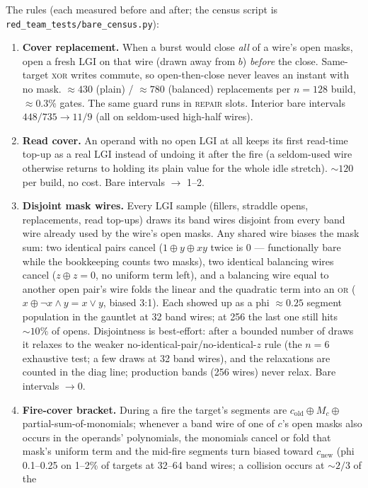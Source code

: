 \documentclass[11pt]{article}
\newcommand{\xor}{\oplus}
\newcommand{\doc}[1]{\texttt{#1}}
\begin{document}
The rules (each measured before and after; the census script is
\doc{red\_team\_tests/bare\_census.py}):
\begin{enumerate}
\item \textbf{Cover replacement.} When a burst would close \emph{all} of a wire's open masks,
  open a fresh LGI on that wire (drawn away from $b$) \emph{before} the close. Same-target
  \textsc{xor} writes commute, so open-then-close never leaves an instant with no mask.
  ${\approx}430$ (plain) / ${\approx}780$ (balanced) replacements per $n=128$ build,
  ${\approx}0.3\%$ gates. The same guard runs in \textsc{repair} slots. Interior bare
  intervals $448/735\to11/9$ (all on seldom-used high-half wires).
\item \textbf{Read cover.} An operand with no open LGI at all keeps its first read-time top-up
  as a real LGI instead of undoing it after the fire (a seldom-used wire otherwise returns
  to holding its plain value for the whole idle stretch). ${\sim}120$ per build, no cost.
  Bare intervals $\to$ 1--2.
\item \textbf{Disjoint mask wires.} Every LGI sample (fillers, straddle opens, replacements,
  read top-ups) draws its band wires disjoint from every band wire already used by the
  wire's open masks. Any shared wire biases the mask sum: two identical pairs cancel
  ($1\xor y\xor xy$ twice is 0 --- functionally bare while the bookkeeping counts two masks),
  two identical balancing wires cancel ($z\xor z=0$, no uniform term left), and a balancing
  wire equal to another open pair's wire folds the linear and the quadratic term into an
  \textsc{or} ($x\xor\neg x{\wedge}y = x\vee y$, biased 3:1). Each showed up as a phi
  ${\approx}0.25$ segment population in the gauntlet at 32 band wires; at 256 the last one
  still hits ${\sim}10\%$ of opens. Disjointness is best-effort: after a bounded number of
  draws it relaxes to the weaker no-identical-pair/no-identical-$z$ rule (the $n=6$
  exhaustive test; a few draws at 32 band wires), and the relaxations are counted in the
  diag line; production bands (256 wires) never relax. Bare intervals $\to0$.
\item \textbf{Fire-cover bracket.} During a fire the target's segments are
  $c_{\mathrm{old}}\xor M_c\xor$ partial-sum-of-monomials; whenever a band wire of one of
  $c$'s open masks also occurs in the operands' polynomials, the monomials cancel or fold that
  mask's uniform term and the mid-fire segments turn biased toward $c_{\mathrm{new}}$ (phi
  0.1--0.25 on 1--2\% of targets at 32--64 band wires; a collision occurs at ${\sim}2/3$ of the

\end{enumerate}
\end{document}
